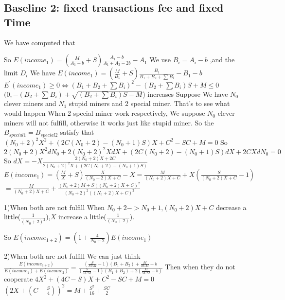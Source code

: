 \documentclass{article}
\begin{document}
\subsection{Baseline 2: fixed transactions fee and fixed Time}
We have computed that \par So $E(income_1)=(\frac{M}{A_1-b}+S)\frac{A_1-b}{A_1+A_2-2b}-A_1$
We use $B_i=A_i-b$ ,and the limit $D_i$
We have $E(income_1)=(\frac{M}{B_1}+S)\frac{B_1}{B_1+B_2+\sum B_i}-B_1-b$
$E^{'}(income_1)\ge 0
\Longleftrightarrow(B_1+B_2+\sum B_i)^2-(B_2+\sum B_i)S+M\le 0$
$(0,-(B_2+\sum B_i)+\sqrt{(B_2+\sum B_i)S-M}$) increases
Suppose We have $N_0$ clever miners and $N_1$ stupid miners and 2 special miner.
That's to see what would happen
When 2 special miner work respectively, We suppose $N_0$ clever miners will not fulfill, otherwise it works just like stupid miner.
So the $B_{special1}=B_{special2}$ satisfy that $(N_0+2)^2X^2+(2C(N_0+2)-(N_0+1)S)X+C^2-SC+M=0$
So $2(N_0+2)X^2dN_0+2(N_0+2)^2XdX+(2C(N_0+2)-(N_0+1)S)dX+2CXdN_0=0$
So $dX=-X\frac{2(N_0+2)X+2C}{2(N_0+2)^2X+(2C(N_0+2)-(N_0+1)S)}$
$E(income_1)=(\frac{M}{X}+S)\frac{X}{(N_0+2)X+C}-X=\frac{M}{(N_0+2)X+C}+X(\frac{S}{(N_0+2)X+C}-1)$
$=\frac{M}{(N_0+2)X+C}+\frac{(N_0+2)M+S((N_0+2)X+C)^2}{(N_0+2)^2((N_0+2)X+C)^2}$
\par1)When both are not fulfill
When $N_0+2->N_0+1$,$(N_0+2)X+C$ decrease a little($\frac{1}{(N_0+2)^2}$),$X$ increase a little($\frac{1}{(N_0+2)}$).
\par So $E(income_{1+2})=(1+\frac{4}{N_0+2})E(income_1)$
\par2)When both are not fulfill
We can just think $\frac{E(income_{1+2})}{E(income_1)+E(income_2)}=\frac{(\frac{S}{SUM}-1)(B_1+B_2)+\frac{M}{SUM}-b}{(\frac{S}{SUM}-1)(B_1+B_2)+2(\frac{M}{SUM}-b)}$
Then when they do not cooperate
 $4X^2+(4C-S)X+C^2-SC+M=0$
 $(2X+(C-\frac{S}{4}))^2=M+\frac{S^2}{16}+\frac{SC}{2}$
\end{document}
